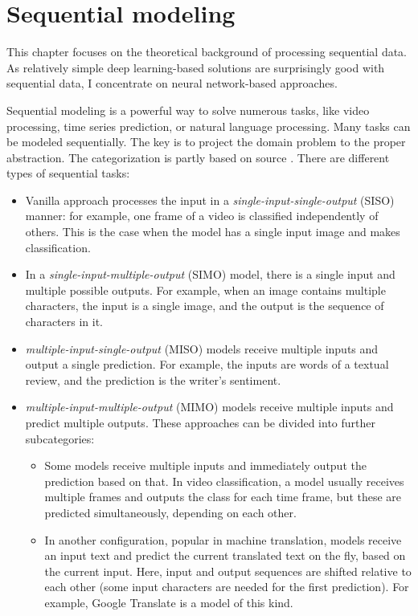 \chapter{Sequential modeling}

This chapter focuses on the theoretical background of processing sequential data. As relatively simple deep learning-based solutions are surprisingly good with sequential data, I concentrate on neural network-based approaches.

Sequential modeling is a powerful way to solve numerous tasks, like video processing, time series prediction, or natural language processing. Many tasks can be modeled sequentially. The key is to project the domain problem to the proper abstraction. The categorization is partly based on source \cite{SequentialLecture}. There are different types of sequential tasks:

\begin{itemize}
  \item Vanilla approach processes the input in a \textit{single-input-single-output} (SISO) manner: for example, one frame of a video is classified independently of others. This is the case when the model has a single input image and makes classification.
  \item In a \textit{single-input-multiple-output} (SIMO) model, there is a single input and multiple possible outputs. For example, when an image contains multiple characters, the input is a single image, and the output is the sequence of characters in it.
  \item \textit{multiple-input-single-output} (MISO) models receive multiple inputs and output a single prediction. For example, the inputs are words of a textual review, and the prediction is the writer's sentiment.
  \item \textit{multiple-input-multiple-output} (MIMO) models receive multiple inputs and predict multiple outputs. These approaches can be divided into further subcategories:
    \begin{itemize}
     \item Some models receive multiple inputs and immediately output the prediction based on that. In video classification, a model usually receives multiple frames and outputs the class for each time frame, but these are predicted simultaneously, depending on each other.
	   \item In another configuration, popular in machine translation, models receive an input text and predict the current translated text on the fly, based on the current input. Here, input and output sequences are shifted relative to each other (some input characters are needed for the first prediction). For example, Google Translate is a model of this kind.
    \end{itemize}
\end{itemize}

